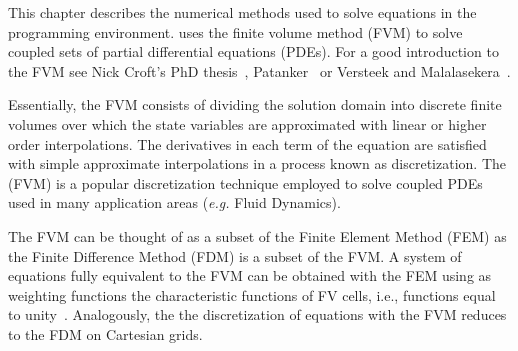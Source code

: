 This chapter describes the numerical methods used to solve equations
in the \FiPy{} programming environment. \FiPy{} uses the finite volume
method (FVM) to solve coupled sets of partial differential equations
(PDEs). For a good introduction to the FVM see Nick Croft's PhD
thesis~\cite{croftphd}, Patanker~\cite{patanker} or Versteek and
Malalasekera~\cite{versteegMalalasekera}.

Essentially, the FVM consists of dividing the solution domain into
discrete finite volumes over which the state variables are
approximated with linear or higher order interpolations. The
derivatives in each term of the equation are satisfied with simple
approximate interpolations in a process known as discretization. The
(FVM) is a popular discretization technique employed to solve coupled
PDEs used in many application areas (\emph{e.g.} Fluid Dynamics).

The FVM can be thought of as a subset of the Finite Element Method
(FEM) as the Finite Difference Method (FDM) is a subset of the FVM. A
system of equations fully equivalent to the FVM can be obtained with
the FEM using as weighting functions the characteristic functions of
FV cells, i.e., functions equal to unity~\cite{mattiussi:1997}. Analogously,
the the discretization of equations with the FVM reduces to the FDM on
Cartesian grids.






